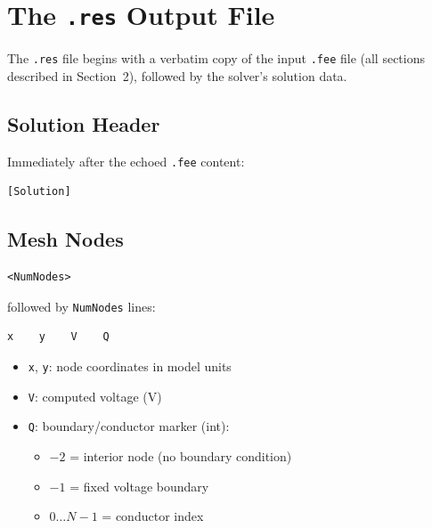\documentclass[11pt]{article}
\begin{document}
\section{The \texttt{.res} Output File}

The \texttt{.res} file begins with a verbatim copy of the input
\texttt{.fee} file (all sections described in Section~2), followed by
the solver's solution data.

\subsection{Solution Header}

Immediately after the echoed \texttt{.fee} content:

\begin{lstlisting}
[Solution]
\end{lstlisting}

\subsection{Mesh Nodes}

\begin{lstlisting}
<NumNodes>
\end{lstlisting}

followed by \texttt{NumNodes} lines:

\begin{lstlisting}
x    y    V    Q
\end{lstlisting}

\begin{itemize}[nosep]
  \item \texttt{x}, \texttt{y}: node coordinates in model units
  \item \texttt{V}: computed voltage (V)
  \item \texttt{Q}: boundary/conductor marker (int):
    \begin{itemize}[nosep]
      \item $-2$ = interior node (no boundary condition)
      \item $-1$ = fixed voltage boundary
      \item $0 \ldots N-1$ = conductor index
    \end{itemize}
\end{itemize}
\end{document}
